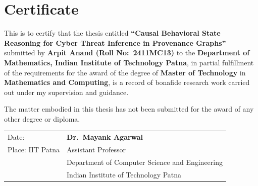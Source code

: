 \chapter*{Certificate}

This is to certify that the thesis entitled \textbf{``Causal Behavioral State Reasoning for Cyber Threat Inference in Provenance Graphs''} submitted by \textbf{Arpit Anand (Roll No:\ 2411MC13)} to the \textbf{Department of Mathematics, Indian Institute of Technology Patna}, in partial fulfillment of the requirements for the award of the degree of \textbf{Master of Technology} in \textbf{Mathematics and Computing}, is a record of bonafide research work carried out under my supervision and guidance.

The matter embodied in this thesis has not been submitted for the award of any other degree or diploma.

\vfill

\noindent
\begin{tabular}{@{}p{7cm}p{7cm}@{}}
Date: \underline{\hspace{4cm}} & \textbf{Dr.\ Mayank Agarwal} \\[6pt]
Place: IIT Patna              & Assistant Professor \\
                               & Department of Computer Science and Engineering \\
                               & Indian Institute of Technology Patna \\
\end{tabular}

\vspace{2cm}
